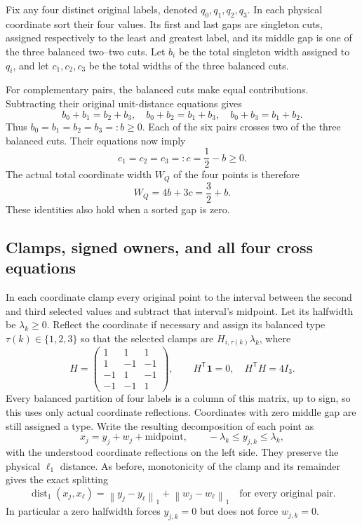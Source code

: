 \documentclass[11pt]{article}
\theoremstyle{definition}
\theoremstyle{remark}
\newcommand{\one}{\mathbf 1}
\newcommand{\dist}{\operatorname{dist}_1}
\newcommand{\norm}[1]{\left\lVert#1\right\rVert_1}
\begin{document}
Fix any four distinct original labels, denoted $q_0,q_1,q_2,q_3$.
In each physical coordinate sort their four values. Its first and last
gaps are singleton cuts, assigned respectively to the least and greatest
label, and its middle gap is one of the three balanced two--two cuts.
Let $b_i$ be the total singleton width assigned to $q_i$, and let
$c_1,c_2,c_3$ be the total widths of the three balanced cuts.

For complementary pairs, the balanced cuts make equal contributions.
Subtracting their original unit-distance equations gives
\[
 b_0+b_1=b_2+b_3,\quad b_0+b_2=b_1+b_3,
 \quad b_0+b_3=b_1+b_2.
\]
Thus $b_0=b_1=b_2=b_3=:b\geq0$. Each of the six pairs crosses
two of the three balanced cuts. Their equations now imply
\begin{equation}\label{eq:quartetcut}
 c_1=c_2=c_3=:c=\frac12-b\geq0.
\end{equation}
The actual total coordinate width $W_Q$ of the four points is therefore
\begin{equation}\label{eq:quartetwidth}
 W_Q=4b+3c=\frac32+b.
\end{equation}
These identities also hold when a sorted gap is zero.

\subsection{Clamps, signed owners, and all four cross equations}

In each coordinate clamp every original point to the interval between
the second and third selected values and subtract that interval's
midpoint. Let its halfwidth be $\lambda_k\geq0$. Reflect the coordinate
if necessary and assign its balanced type $\tau(k)\in\{1,2,3\}$ so
that the selected clamps are $H_{i,\tau(k)}\lambda_k$, where
\begin{equation}\label{eq:Hmatrix}
 H=\begin{pmatrix}
 1&1&1\\1&-1&-1\\-1&1&-1\\-1&-1&1
 \end{pmatrix},\qquad
 H^{\mathsf T}\one=0,\quad H^{\mathsf T}H=4I_3.
\end{equation}
Every balanced partition of four labels is a column of this matrix,
up to sign, so this uses only actual coordinate reflections. Coordinates
with zero middle gap are still assigned a type. Write the resulting
decomposition of each point as
\[
 x_j=y_j+w_j+\text{midpoint},
 \qquad -\lambda_k\leq y_{j,k}\leq\lambda_k,
\]
with the understood coordinate reflections on the left side. They
preserve the physical $\ell_1$ distance. As before, monotonicity of the
clamp and its remainder gives the exact splitting
\begin{equation}\label{eq:quartetsplit}
 \dist(x_j,x_\ell)=\norm{y_j-y_\ell}+\norm{w_j-w_\ell}
 \quad\text{for every original pair.}
\end{equation}
In particular a zero halfwidth forces $y_{j,k}=0$ but does not force
$w_{j,k}=0$.
\end{document}
